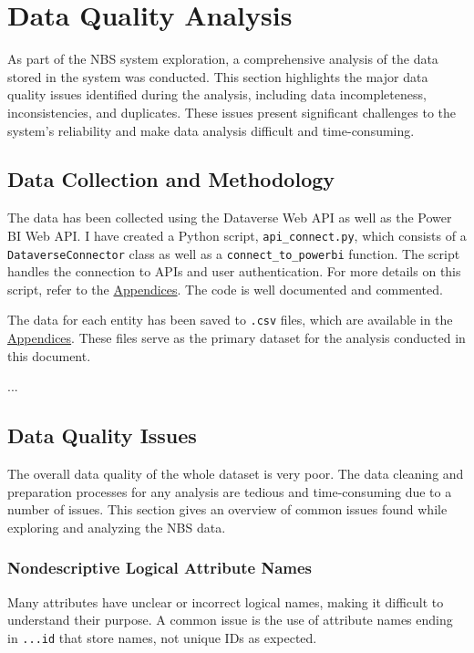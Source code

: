 \section{Data Quality Analysis}

As part of the NBS system exploration, a comprehensive analysis of the data stored in the system was conducted. This section highlights the major data quality issues identified during the analysis, including data incompleteness, inconsistencies, and duplicates. These issues present significant challenges to the system’s reliability and make data analysis difficult and time-consuming.

\subsection{Data Collection and Methodology}

The data has been collected using the Dataverse Web API as well as the Power BI Web API. I have created a Python script, \texttt{api\_connect.py}, which consists of a \texttt{DataverseConnector} class as well as a \texttt{connect\_to\_powerbi} function. The script handles the connection to APIs and user authentication. For more details on this script, refer to the \hyperref[sec:Appendices]{Appendices}. The code is well documented and commented.

The data for each entity has been saved to \texttt{.csv} files, which are available in the \hyperref[sec:Appendices]{Appendices}. These files serve as the primary dataset for the analysis conducted in this document.

...

\subsection{Data Quality Issues}

The overall data quality of the whole dataset is very poor. The data cleaning and preparation processes for any analysis are tedious and time-consuming due to a number of issues. This section gives an overview of common issues found while exploring and analyzing the NBS data.

\subsubsection{Nondescriptive Logical Attribute Names}
Many attributes have unclear or incorrect logical names, making it difficult to understand their purpose. A common issue is the use of attribute names ending in \texttt{...id} that store names, not unique IDs as expected.

